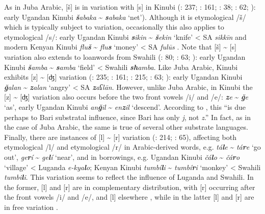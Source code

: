\documentclass[output=paper]{langsci/langscibook}
\begin{document}
  As in Juba Arabic, [š] is in variation with [s] in Kinubi (\citealt{Owens1985}: 237; \citealt{Owens1997}: 161; \citealt{Wellens2003}: 38; \citealt{Luffin2005}: 62; \citealt{Avram2017talk}): early Ugandan Kinubi \textit{\textbf{š}abaka} {\textasciitilde} \textit{\textbf{s}abaka} ‘net’). Although it is etymological /š/ which is typically subject to variation, occasionally this also applies to etymological /s/: early Ugandan Kinubi \textit{\textbf{s}ikin} {\textasciitilde} \textit{\textbf{š}ekin} ‘knife’ < SA \textit{sikkīn} \citep{Avram2017talk} and modern Kenyan Kinubi \textit{flu\textbf{š}} {\textasciitilde} \textit{flu\textbf{s}} ‘money’ < SA \textit{fulūs} \citep[63]{Luffin2005}. Note that [š] {\textasciitilde} [s] variation also extends to loanwords from Swahili (\citealt{Wellens2003}: 80; \citealt{Luffin2005}: 63; \citealt{Avram2017talk}): early Ugandan Kinubi \textit{\textbf{š}amba} {\textasciitilde} \textit{\textbf{s}amba} ‘field’ < Swahili \textit{\textbf{sh}amba}. Like Juba Arabic, Kinubi exhibits [z] {\textasciitilde} [ʤ] variation (\citealt{Owens1985}: 235; \citealt{Owens1997}: 161; \citealt{Wellens2003}: 215; \citealt{Luffin2005}: 63; \citealt{Avram2017talk}): early Ugandan Kinubi \textit{\textbf{ǧ}alan} {\textasciitilde} \textit{\textbf{z}alan} ‘angry’ < SA \textit{\textbf{z}aʕlān}. However, unlike Juba Arabic, in Kinubi the [z] {\textasciitilde} [ʤ] variation also occurs before the two front vowels /i/ and /e/: \textit{\textbf{z}e} {\textasciitilde} \textit{\textbf{ǧ}e} ‘as’, early Ugandan Kinubi \textit{an\textbf{ǧ}il} {\textasciitilde} \textit{en\textbf{z}il} ‘descend’. According to \citet[161]{Owens1997}, this “is due perhaps to Bari substratal influence, since Bari has only \textit{j}, not \textit{z}.” In fact, as in the case of Juba Arabic, the same is true of several other substrate languages. Finally, there are instances of [l] {\textasciitilde} [r] variation (\citealt{Wellens2003}: 214; \citealt{Luffin2005}: 65), affecting both etymological /l/ and etymological /r/ in Arabic-derived words, e.g. \textit{tá\textbf{l}e} {\textasciitilde} \textit{tá\textbf{r}e} ‘go out’, \textit{ge\textbf{r}í} {\textasciitilde} \textit{ge\textbf{l}í} ‘near’, and in borrowings, e.g. Ugandan Kinubi \textit{čá\textbf{l}o} {\textasciitilde} \textit{čá\textbf{r}o} ‘village’ < Luganda \textit{e-kya\textbf{l}o}; Kenyan Kinubi \textit{tumbí\textbf{l}i} {\textasciitilde} \textit{tumbí\textbf{r}i} ‘monkey’ < Swahili \textit{tumbi\textbf{l}i}. This variation seems to reflect the influence of Luganda and Swahili. In the former, [l] and [r] are in complementary distribution, with [r] occurring after the front vowels /i/ and /e/, and [l] elsewhere \citep[214]{Wellens2003}, while in the latter [l] and [r] are in free variation \citep[79]{Luffin2014}. 
\end{document}
